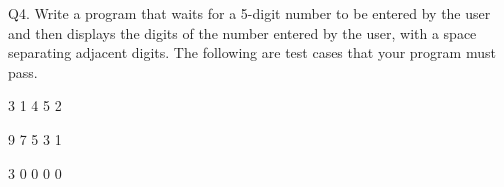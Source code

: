 Q4. Write a program that waits for a 5-digit number to be entered by the user 
and then displays the digits of the number entered by the user, 
with a space separating adjacent digits. 
The following are test cases that your program must pass.

\resett
\nextt
\begin{console}[commandchars=\\\{\}]
3 1 4 5 2
\end{console}

\nextt
\begin{console}[commandchars=\\\{\}]
9 7 5 3 1
\end{console}

\nextt
\begin{console}[commandchars=\\\{\}]
3 0 0 0 0
\end{console}
